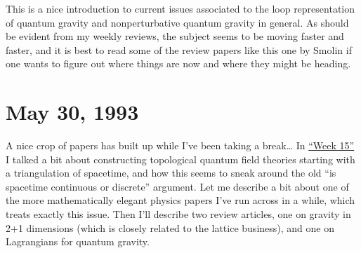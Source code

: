 \documentclass[12pt]{article}
\def\tightlist{}
\renewcommand{\texttt}[1]{%
  \begingroup
  \ttfamily
  \begingroup\lccode`~=`/\lowercase{\endgroup\def~}{/\discretionary{}{}{}}%
  \begingroup\lccode`~=`[\lowercase{\endgroup\def~}{[\discretionary{}{}{}}%
  \begingroup\lccode`~=`.\lowercase{\endgroup\def~}{.\discretionary{}{}{}}%
  \catcode`/=\active\catcode`[=\active\catcode`.=\active
  \scantokens{#1\noexpand}%
  \endgroup
}
\begin{document}
This is a nice introduction to current issues associated to the loop
representation of quantum gravity and nonperturbative quantum gravity in
general. As should be evident from my weekly reviews, the subject seems
to be moving faster and faster, and it is best to read some of the
review papers like this one by Smolin if one wants to figure out where
things are now and where they might be heading.



\hypertarget{week16}{%
\section{May 30, 1993}\label{week16}}

A nice crop of papers has built up while I've been taking a
break\ldots{} In \protect\hyperlink{week15}{``Week 15''} I talked a bit
about constructing topological quantum field theories starting with a
triangulation of spacetime, and how this seems to sneak around the old
``is spacetime continuous or discrete'' argument. Let me describe a bit
about one of the more mathematically elegant physics papers I've run
across in a while, which treats exactly this issue. Then I'll describe
two review articles, one on gravity in 2+1 dimensions (which is closely
related to the lattice business), and one on Lagrangians for quantum
gravity.

\end{document}
